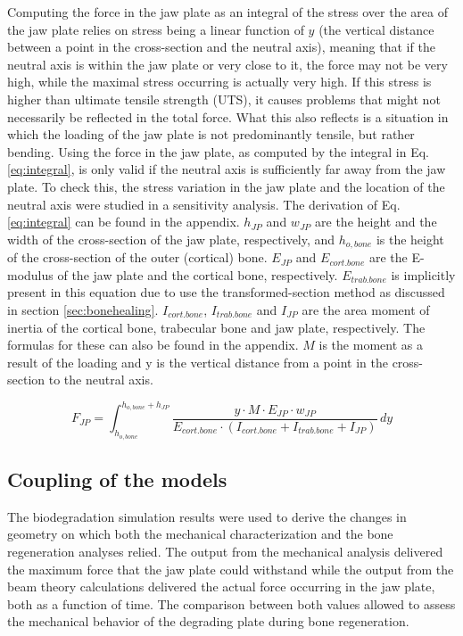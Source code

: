 Computing the force in the jaw plate as an integral of the stress over the area of the jaw plate relies on stress being a linear function of $y$ (the vertical distance between a point in the cross-section and the neutral axis), meaning that if the neutral axis is within the jaw plate or very close to it, the force may not be very high, while the maximal stress occurring is actually very high. If this stress is higher than ultimate tensile strength (UTS), it causes problems that might not necessarily be reflected in the total force. What this also reflects is a situation in which the loading of the jaw plate is not predominantly tensile, but rather bending. Using the force in the jaw plate, as computed by the integral in Eq. \ref{eq:integral}, is only valid if the neutral axis is sufficiently far away from the jaw plate. To check this, the stress variation in the jaw plate and the location of the neutral axis were studied in a sensitivity analysis. The derivation of Eq. \ref{eq:integral} can be found in the appendix. $h_{JP}$ and $w_{JP}$ are the height and the width of the cross-section of the jaw plate, respectively, and $h_{o,bone}$ is the height of the cross-section of the outer (cortical) bone. $E_{JP}$ and $E_{cort.bone}$ are the E-modulus of the jaw plate and the cortical bone, respectively. $E_{trab.bone}$ is implicitly present in this equation due to use the transformed-section method as discussed in section \ref{sec:bonehealing}. $I_{cort.bone}$, $I_{trab.bone}$ and $I_{JP}$ are the area moment of inertia of the cortical bone, trabecular bone and jaw plate, respectively. The formulas for these can also be found in the appendix. $M$ is the moment as a result of the loading and y is the vertical distance from a point in the cross-section to the neutral axis.

\begin{equation}
F_{JP}=\int_{h_{o,bone}}^{h_{o,bone}+h_{JP}} \frac{y \cdot M \cdot E_{JP} \cdot w_{JP}}{E_{cort.bone} \cdot (I_{cort.bone}+I_{trab.bone}+I_{JP})}  \,dy
\label{eq:integral}
\end{equation}


\subsection{Coupling of the models}

The biodegradation simulation results were used to derive the changes in geometry on which both the mechanical characterization and the bone regeneration analyses relied. The output from the mechanical analysis delivered the maximum force that the jaw plate could withstand while the output from the beam theory calculations delivered the actual force occurring in the jaw plate, both as a function of time. The comparison between both values allowed to assess the mechanical behavior of the degrading plate during bone regeneration.

